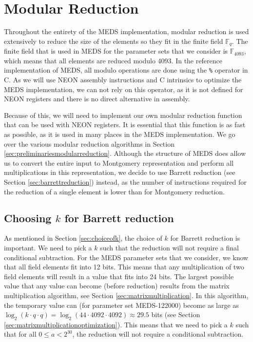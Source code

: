 \documentclass[11pt,a4paper]{report}
\theoremstyle{definition}
\begin{document}
\section{Modular Reduction}
\label{sec:modularreduction}
Throughout the entirety of the MEDS implementation, modular reduction is used extensively to reduce the size of the elements so they fit in the finite field $\mathbb{F}_q$. The finite field that is used in MEDS for the parameter sets that we consider is $\mathbb{F}_{4093}$, which means that all elements are reduced modulo 4093. In the reference implementation of MEDS, all modulo operations are done using the \texttt{\%} operator in C. As we will use NEON assembly instructions and C intrinsics to optimize the MEDS implementation, we can not rely on this operator, as it is not defined for NEON registers and there is no direct alternative in assembly.

Because of this, we will need to implement our own modular reduction function that can be used with NEON registers. It is essential that this function is as fast as possible, as it is used in many places in the MEDS implementation. We go over the various modular reduction algorithms in Section \ref{sec:preliminariesmodularreduction}. Although the structure of MEDS does allow us to convert the entire input to Montgomery representation and perform all multiplications in this representation, we decide to use Barrett reduction (see Section \ref{sec:barrettreduction}) instead, as the number of instructions required for the reduction of a single element is lower than for Montgomery reduction.

\subsection{Choosing $k$ for Barrett reduction}
As mentioned in Section \ref{sec:choiceofk}, the choice of $k$ for Barrett reduction is important. We need to pick a $k$ such that the reduction will not require a final conditional subtraction. For the MEDS parameter sets that we consider, we know that all field elements fit into 12 bits. This means that any multiplication of two field elements will result in a value that fits into 24 bits. The largest possible value that any value can become (before reduction) results from the matrix multiplication algorithm, see Section \ref{sec:matrixmultiplication}. In this algorithm, the temporary value can (for parameter set MEDS-122000) become as large as $\log_2(k \cdot q \cdot q) = \log_2(44 \cdot 4092 \cdot 4092) \approx 29.5$ bits (see Section \ref{sec:matrixmultiplicationoptimization}). This means that we need to pick a $k$ such that for all $0 \leq a < 2^{30}$, the reduction will not require a conditional subtraction.
\end{document}
